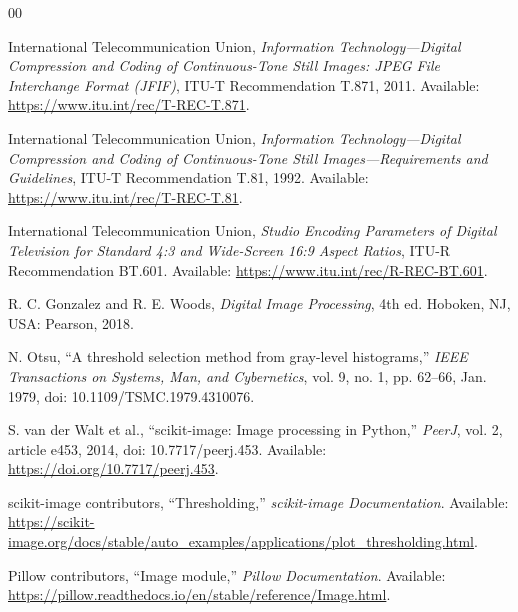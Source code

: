 \begin{thebibliography}{00}

\normalsize %

International Telecommunication Union, \emph{Information Technology---Digital Compression and Coding of Continuous-Tone Still Images: JPEG File Interchange Format (JFIF)}, ITU-T Recommendation T.871, 2011. Available: \url{https://www.itu.int/rec/T-REC-T.871}.

International Telecommunication Union, \emph{Information Technology---Digital Compression and Coding of Continuous-Tone Still Images---Requirements and Guidelines}, ITU-T Recommendation T.81, 1992. Available: \url{https://www.itu.int/rec/T-REC-T.81}.

International Telecommunication Union, \emph{Studio Encoding Parameters of Digital Television for Standard 4:3 and Wide-Screen 16:9 Aspect Ratios}, ITU-R Recommendation BT.601. Available: \url{https://www.itu.int/rec/R-REC-BT.601}.

R. C. Gonzalez and R. E. Woods, \emph{Digital Image Processing}, 4th ed. Hoboken, NJ, USA: Pearson, 2018.

N. Otsu, ``A threshold selection method from gray-level histograms,'' \emph{IEEE Transactions on Systems, Man, and Cybernetics}, vol. 9, no. 1, pp. 62--66, Jan. 1979, doi: 10.1109/TSMC.1979.4310076.

S. van der Walt et al., ``scikit-image: Image processing in Python,'' \emph{PeerJ}, vol. 2, article e453, 2014, doi: 10.7717/peerj.453. Available: \url{https://doi.org/10.7717/peerj.453}.

scikit-image contributors, ``Thresholding,'' \emph{scikit-image Documentation}. Available: \url{https://scikit-image.org/docs/stable/auto_examples/applications/plot_thresholding.html}.

Pillow contributors, ``Image module,'' \emph{Pillow Documentation}. Available: \url{https://pillow.readthedocs.io/en/stable/reference/Image.html}.

\end{thebibliography}
